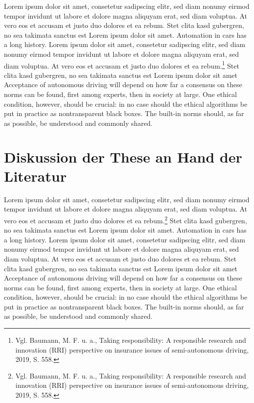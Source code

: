 Lorem ipsum dolor sit amet, consetetur sadipscing elitr, sed diam nonumy eirmod tempor invidunt ut labore et dolore magna aliquyam erat, sed diam voluptua. 
At vero eos et accusam et justo duo dolores et ea rebum. 
Stet clita kasd gubergren, no sea takimata sanctus est Lorem ipsum dolor sit amet. 
Automation in cars has a long history.  Lorem ipsum dolor sit amet, consetetur sadipscing elitr, sed diam nonumy eirmod tempor invidunt ut labore et dolore magna aliquyam erat, sed diam voluptua. 
At vero eos et accusam et justo duo dolores et ea rebum.\footnote{Vgl. Baumann, M. F. u. a., Taking responsibility: A responsible research and innovation (RRI) perspective on insurance issues of semi-autonomous driving, 2019, S. 558.} 
Stet clita kasd gubergren, no sea takimata sanctus est Lorem ipsum dolor sit amet Acceptance of autonomous driving will depend on how far a consensus on these norms can be found, first among experts, then in society at large. 
One ethical condition, however, should be crucial: in no case should the ethical algorithms be put in practice as nontransparent black boxes. 
The built-in norms should, as far as possible, be understood and commonly shared.

\section{Diskussion der These an Hand der Literatur}

Lorem ipsum dolor sit amet, consetetur sadipscing elitr, sed diam nonumy eirmod tempor invidunt ut labore et dolore magna aliquyam erat, sed diam voluptua. 
At vero eos et accusam et justo duo dolores et ea rebum.\footnote{Vgl. Baumann, M. F. u. a., Taking responsibility: A responsible research and innovation (RRI) perspective on insurance issues of semi-autonomous driving, 2019, S. 558.} 
Stet clita kasd gubergren, no sea takimata sanctus est Lorem ipsum dolor sit amet. 
Automation in cars has a long history.  Lorem ipsum dolor sit amet, consetetur sadipscing elitr, sed diam nonumy eirmod tempor invidunt ut labore et dolore magna aliquyam erat, sed diam voluptua. 
At vero eos et accusam et justo duo dolores et ea rebum. 
Stet clita kasd gubergren, no sea takimata sanctus est Lorem ipsum dolor sit amet Acceptance of autonomous driving will depend on how far a consensus on these norms can be found, first among experts, then in society at large. 
One ethical condition, however, should be crucial: in no case should the ethical algorithms be put in practice as nontransparent black boxes. 
The built-in norms should, as far as possible, be understood and commonly shared.


